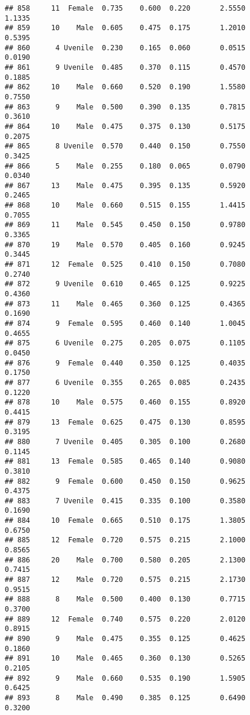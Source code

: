 \documentclass[
]{article}
\begin{document}
\begin{verbatim}
## 858     11  Female  0.735    0.600  0.220       2.5550         1.1335
## 859     10    Male  0.605    0.475  0.175       1.2010         0.5395
## 860      4 Uvenile  0.230    0.165  0.060       0.0515         0.0190
## 861      9 Uvenile  0.485    0.370  0.115       0.4570         0.1885
## 862     10    Male  0.660    0.520  0.190       1.5580         0.7550
## 863      9    Male  0.500    0.390  0.135       0.7815         0.3610
## 864     10    Male  0.475    0.375  0.130       0.5175         0.2075
## 865      8 Uvenile  0.570    0.440  0.150       0.7550         0.3425
## 866      5    Male  0.255    0.180  0.065       0.0790         0.0340
## 867     13    Male  0.475    0.395  0.135       0.5920         0.2465
## 868     10    Male  0.660    0.515  0.155       1.4415         0.7055
## 869     11    Male  0.545    0.450  0.150       0.9780         0.3365
## 870     19    Male  0.570    0.405  0.160       0.9245         0.3445
## 871     12  Female  0.525    0.410  0.150       0.7080         0.2740
## 872      9 Uvenile  0.610    0.465  0.125       0.9225         0.4360
## 873     11    Male  0.465    0.360  0.125       0.4365         0.1690
## 874      9  Female  0.595    0.460  0.140       1.0045         0.4655
## 875      6 Uvenile  0.275    0.205  0.075       0.1105         0.0450
## 876      9  Female  0.440    0.350  0.125       0.4035         0.1750
## 877      6 Uvenile  0.355    0.265  0.085       0.2435         0.1220
## 878     10    Male  0.575    0.460  0.155       0.8920         0.4415
## 879     13  Female  0.625    0.475  0.130       0.8595         0.3195
## 880      7 Uvenile  0.405    0.305  0.100       0.2680         0.1145
## 881     13  Female  0.585    0.465  0.140       0.9080         0.3810
## 882      9  Female  0.600    0.450  0.150       0.9625         0.4375
## 883      7 Uvenile  0.415    0.335  0.100       0.3580         0.1690
## 884     10  Female  0.665    0.510  0.175       1.3805         0.6750
## 885     12  Female  0.720    0.575  0.215       2.1000         0.8565
## 886     20    Male  0.700    0.580  0.205       2.1300         0.7415
## 887     12    Male  0.720    0.575  0.215       2.1730         0.9515
## 888      8    Male  0.500    0.400  0.130       0.7715         0.3700
## 889     12  Female  0.740    0.575  0.220       2.0120         0.8915
## 890      9    Male  0.475    0.355  0.125       0.4625         0.1860
## 891     10    Male  0.465    0.360  0.130       0.5265         0.2105
## 892      9    Male  0.660    0.535  0.190       1.5905         0.6425
## 893      8    Male  0.490    0.385  0.125       0.6490         0.3200

\end{verbatim}
\end{document}
